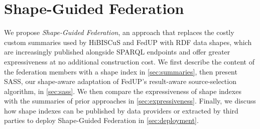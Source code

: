 \section{Shape-Guided Federation}\label{sec:approach}

We propose \emph{Shape-Guided Federation}, an approach that replaces the costly custom summaries
used by HiBISCuS and FedUP with RDF data shapes, which are increasingly published alongside
SPARQL endpoints and offer greater expressiveness at no additional construction cost.
We first describe the content of the federation members with a shape index in \cref{sec:summaries},
then present \ac{SASS}, our shape-aware adaptation of FedUP's result-aware source-selection
algorithm, in \cref{sec:sass}.
We then compare the expressiveness of shape indexes with the summaries of prior approaches in \cref{sec:expressiveness}.
Finally, we discuss how shape indexes can be published by data providers or extracted by third parties to deploy Shape-Guided Federation in \cref{sec:deployment}.








